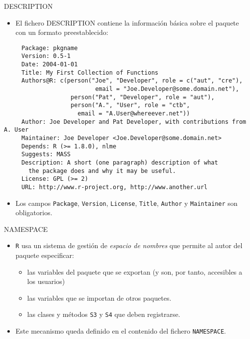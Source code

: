 \documentclass[xcolor={usenames,svgnames,dvipsnames}]{beamer}
\begin{document}
\begin{frame}[fragile,label={sec:org7d29257}]{DESCRIPTION}
 \begin{itemize}
\item El fichero DESCRIPTION contiene la información básica sobre el
paquete con un formato preestablecido:
\end{itemize}
\begin{verbatim}
     Package: pkgname
     Version: 0.5-1
     Date: 2004-01-01
     Title: My First Collection of Functions
     Authors@R: c(person("Joe", "Developer", role = c("aut", "cre"),
                          email = "Joe.Developer@some.domain.net"),
                   person("Pat", "Developer", role = "aut"),
                   person("A.", "User", role = "ctb",
     	             email = "A.User@whereever.net"))
     Author: Joe Developer and Pat Developer, with contributions from A. User
     Maintainer: Joe Developer <Joe.Developer@some.domain.net>
     Depends: R (>= 1.8.0), nlme
     Suggests: MASS
     Description: A short (one paragraph) description of what
       the package does and why it may be useful.
     License: GPL (>= 2)
     URL: http://www.r-project.org, http://www.another.url
\end{verbatim}
\begin{itemize}
\item Los campos \texttt{Package}, \texttt{Version}, \texttt{License}, \texttt{Title}, \texttt{Author} y
\texttt{Maintainer} son obligatorios.
\end{itemize}
\end{frame}
\begin{frame}[fragile,label={sec:orgb2bedda}]{NAMESPACE}
 \begin{itemize}
\item \texttt{R} usa un sistema de gestión de \emph{espacio de nombres} que
permite al autor del paquete especificar:
\begin{itemize}
\item las variables del paquete que se exportan (y son, por tanto,
accesibles a los usuarios)
\item las variables que se importan de otros paquetes.
\item las clases y métodos \texttt{S3} y \texttt{S4} que deben registrarse.
\end{itemize}
\item Este mecanismo queda definido en el contenido del fichero
\texttt{NAMESPACE}.
\end{itemize}
\end{frame}
\end{document}
